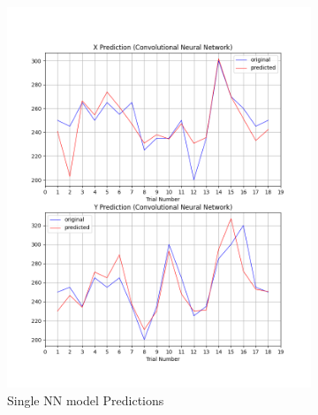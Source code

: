 \documentclass[12pt]{article}
\begin{document}
\begin{figure}[h!]
\centering
\begin{subfigure}{0.4\textwidth}
	\includegraphics[scale=0.35]{Images/Single CNN prediction.png}
	\caption{Single NN model Predictions}
	\label{One NN model with two outputs}
\end{subfigure}%
\begin{subfigure}{0.4\textwidth}

\end{subfigure}
\end{figure}
\end{document}
